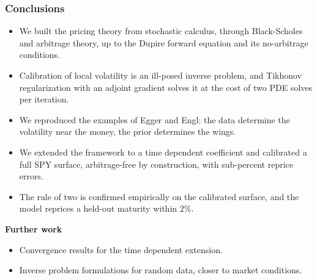 
\begin{frame}
\frametitle{Conclusions}
\begin{scriptsize}
\begin{itemize}
\item We built the pricing theory from stochastic calculus, through Black-Scholes and arbitrage theory,
up to the Dupire forward equation and its no-arbitrage conditions.
\item Calibration of local volatility is an ill-posed inverse problem,
and Tikhonov regularization with an adjoint gradient solves it at the cost of two PDE solves per iteration.
\item We reproduced the examples of Egger and Engl:
the data determine the volatility near the money, the prior determines the wings.
\item We extended the framework to a time dependent coefficient and calibrated a full SPY surface,
arbitrage-free by construction, with sub-percent reprice errors.
\item The rule of two is confirmed empirically on the calibrated surface,
and the model reprices a held-out maturity within $2\%$.
\end{itemize}
\medskip

\textbf{Further work}
\begin{itemize}
\item Convergence results for the time dependent extension.
\item Inverse problem formulations for random data, closer to market conditions.
\end{itemize}
\end{scriptsize}
\end{frame}

